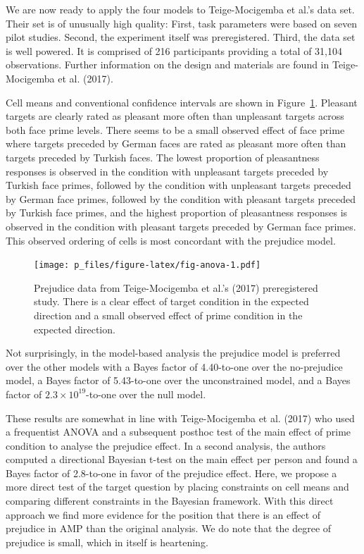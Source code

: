 \documentclass[english,,man]{apa6}
\begin{document}
We are now ready to apply the four models to Teige-Mocigemba et al.'s data set. Their set is of unusually high quality: First, task parameters were based on seven pilot studies. Second, the experiment itself was preregistered. Third, the data set is well powered. It is comprised of 216 participants providing a total of 31,104 observations. Further information on the design and materials are found in Teige-Mocigemba et al. (2017).

Cell means and conventional confidence intervals are shown in Figure~\ref{fig:fig-anova}. Pleasant targets are clearly rated as pleasant more often than unpleasant targets across both face prime levels. There seems to be a small observed effect of face prime where targets preceded by German faces are rated as pleasant more often than targets preceded by Turkish faces. The lowest proportion of pleasantness responses is observed in the condition with unpleasant targets preceded by Turkish face primes, followed by the condition with unpleasant targets preceded by German face primes, followed by the condition with pleasant targets preceded by Turkish face primes, and the highest proportion of pleasantness responses is observed in the condition with pleasant targets preceded by German face primes. This observed ordering of cells is most concordant with the prejudice model.

\begin{figure}
\centering
\texttt{[image: p\_files/figure-latex/fig-anova-1.pdf]}
\caption{\label{fig:fig-anova}Prejudice data from Teige-Mocigemba et al.'s (2017) preregistered study. There is a clear effect of target condition in the expected direction and a small observed effect of prime condition in the expected direction.}
\end{figure}

Not surprisingly, in the model-based analysis the prejudice model is preferred over the other models with a Bayes factor of 4.40-to-one over the no-prejudice model, a Bayes factor of 5.43-to-one over the unconstrained model, and a Bayes factor of \(2.3 \times 10^{19}\)-to-one over the null model.

These results are somewhat in line with Teige-Mocigemba et al. (2017) who used a frequentist ANOVA and a subsequent posthoc test of the main effect of prime condition to analyse the prejudice effect. In a second analysis, the authors computed a directional Bayesian t-test on the main effect per person and found a Bayes factor of 2.8-to-one in favor of the prejudice effect. Here, we propose a more direct test of the target question by placing constraints on cell means and comparing different constraints in the Bayesian framework. With this direct approach we find more evidence for the position that there is an effect of prejudice in AMP than the original analysis. We do note that the degree of prejudice is small, which in itself is heartening.
\end{document}

